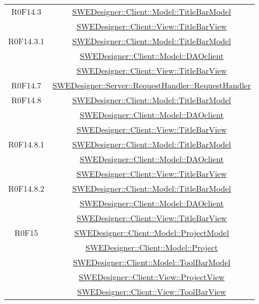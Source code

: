 \documentclass[../DefinizioneDiProdotto.tex]{subfiles}
\begin{document}
\begin{longtable}{|c|c|}
				R0F14.3
				& \hyperlink{SWEDesigner::Client::Model::TitleBarModel}{SWEDesigner::Client::Model::TitleBarModel}\\
				& \hyperlink{SWEDesigner::Client::View::TitleBarView}{SWEDesigner::Client::View::TitleBarView}\\
				\hline

				R0F14.3.1
				& \hyperlink{SWEDesigner::Client::Model::TitleBarModel}{SWEDesigner::Client::Model::TitleBarModel}\\
				& \hyperlink{SWEDesigner::Client::Model::DAOclient}{SWEDesigner::Client::Model::DAOclient}\\
				& \hyperlink{SWEDesigner::Client::View::TitleBarView}{SWEDesigner::Client::View::TitleBarView}\\
				\hline

				R0F14.7
				& \hyperlink{SWEDesigner::Server::RequestHandler::RequestHandler}{SWEDesigner::Server::RequestHandler::RequestHandler}\\
				\hline

				R0F14.8
				& \hyperlink{SWEDesigner::Client::Model::TitleBarModel}{SWEDesigner::Client::Model::TitleBarModel}\\
				& \hyperlink{SWEDesigner::Client::Model::DAOclient}{SWEDesigner::Client::Model::DAOclient}\\
				& \hyperlink{SWEDesigner::Client::View::TitleBarView}{SWEDesigner::Client::View::TitleBarView}\\
				\hline

				R0F14.8.1
				& \hyperlink{SWEDesigner::Client::Model::TitleBarModel}{SWEDesigner::Client::Model::TitleBarModel}\\
				& \hyperlink{SWEDesigner::Client::Model::DAOclient}{SWEDesigner::Client::Model::DAOclient}\\
				& \hyperlink{SWEDesigner::Client::View::TitleBarView}{SWEDesigner::Client::View::TitleBarView}\\
				\hline

				R0F14.8.2
				& \hyperlink{SWEDesigner::Client::Model::TitleBarModel}{SWEDesigner::Client::Model::TitleBarModel}\\
				& \hyperlink{SWEDesigner::Client::Model::DAOclient}{SWEDesigner::Client::Model::DAOclient}\\
				& \hyperlink{SWEDesigner::Client::View::TitleBarView}{SWEDesigner::Client::View::TitleBarView}\\
				\hline

				R0F15
				& \hyperlink{SWEDesigner::Client::Model::ProjectModel}{SWEDesigner::Client::Model::ProjectModel}\\
				& \hyperlink{SWEDesigner::Client::Model::Project}{SWEDesigner::Client::Model::Project}\\
				& \hyperlink{SWEDesigner::Client::Model::ToolBarModel}{SWEDesigner::Client::Model::ToolBarModel}\\
				& \hyperlink{SWEDesigner::Client::View::ProjectView}{SWEDesigner::Client::View::ProjectView}\\
				& \hyperlink{SWEDesigner::Client::View::ToolBarView}{SWEDesigner::Client::View::ToolBarView}\\
				\hline


\end{longtable}
\end{document}
